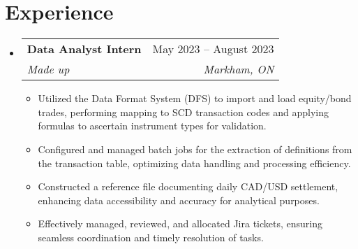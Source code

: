 \documentclass[letterpaper,11pt]{article}
\makeatletter
\newcommand{\resumeItem}[1]{
  \item\small{
    {#1 \vspace{-2pt}}
  }
}
\newcommand{\resumeSubheading}[4]{
  \vspace{-2pt}\item
    \begin{tabular*}{0.97\textwidth}[t]{l@{\extracolsep{\fill}}r}
      \textbf{#1} & #2 \\
      \textit{\small#3} & \textit{\small #4} \\
    \end{tabular*}\vspace{-7pt}
}
\newcommand{\resumeSubHeadingListStart}{\begin{itemize}[leftmargin=0.15in, label={}]}
\newcommand{\resumeSubHeadingListEnd}{\end{itemize}}
\newcommand{\resumeItemListStart}{\begin{itemize}}
\newcommand{\resumeItemListEnd}{\end{itemize}\vspace{-5pt}}
\makeatother
\begin{document}
\section{Experience}
  \resumeSubHeadingListStart
    \resumeSubheading
    {Data Analyst Intern}{May 2023 -- August 2023}
    {Made up}{Markham, ON}
\resumeItemListStart
    \resumeItem{Utilized the Data Format System (DFS) to import and load equity/bond trades, performing mapping to SCD transaction codes and applying formulas to ascertain instrument types for validation.}
    \resumeItem{Configured and managed batch jobs for the extraction of definitions from the transaction table, optimizing data handling and processing efficiency.}
    \resumeItem{Constructed a reference file documenting daily CAD/USD settlement, enhancing data accessibility and accuracy for analytical purposes.}
    \resumeItem{Effectively managed, reviewed, and allocated Jira tickets, ensuring seamless coordination and timely resolution of tasks.}
\resumeItemListEnd

\resumeSubHeadingListEnd

\end{document}
